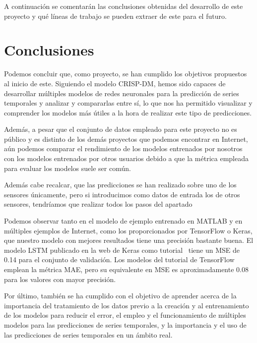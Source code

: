 
A continuación se comentarán las conclusiones obtenidas del desarrollo de este proyecto y qué líneas de trabajo se pueden extraer de este para el futuro.

\section{Conclusiones}

Podemos concluir que, como proyecto, se han cumplido los objetivos propuestos al inicio de este. Siguiendo el modelo CRISP-DM, hemos sido capaces de desarrollar múltiples modelos de redes neuronales para la predicción de series temporales y analizar y compararlas entre sí, lo que nos ha permitido visualizar y comprender los modelos más útiles a la hora de realizar este tipo de predicciones.

\par

Además, a pesar que el conjunto de datos empleado para este proyecto no es público y es distinto de los demás proyectos que podemos encontrar en Internet, aún podemos comparar el rendimiento de los modelos entrenados por nosotros con los modelos entrenados por otros usuarios debido a que la métrica empleada para evaluar los modelos suele ser común.

\par

Además cabe recalcar, que las predicciones se han realizado sobre uno de los sensores únicamente, pero si introducimos como datos de entrada los de otros sensores, tendríamos que realizar todos los pasos del apartado 

\par

Podemos observar tanto en el modelo de ejemplo entrenado en MATLAB y en múltiples ejemplos de Internet, como los proporcionados por TensorFlow o Keras, que nuestro modelo con mejores resultados tiene una precisión bastante buena. El modelo LSTM publicado en la web de Keras como tutorial~\cite{keras:tutorial} tiene un MSE de 0.14 para el conjunto de validación. Los modelos del tutorial de TensorFlow~\cite{tensorflow:tutorial} emplean la métrica MAE, pero su equivalente en MSE es aproximadamente 0.08 para los valores con mayor precisión.

\par

Por último, también se ha cumplido con el objetivo de aprender acerca de la importancia del tratamiento de los datos previo a la creación y al entrenamiento de los modelos para reducir el error, el empleo y el funcionamiento de múltiples modelos para las predicciones de series temporales, y la importancia y el uso de las predicciones de series temporales en un ámbito real.

